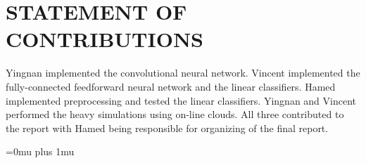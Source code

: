 \documentclass[letterpaper, 10 pt, conference]{ieeeconf}  %
\begin{document}
\addtolength{\textheight}{-12cm}   %






\section*{STATEMENT OF CONTRIBUTIONS}
Yingnan implemented the convolutional neural network.
Vincent implemented the fully-connected feedforward neural
network and the linear classifiers. Hamed implemented preprocessing and tested the linear classifiers. Yingnan and Vincent performed the heavy simulations using on-line clouds. All three contributed to the report with Hamed being responsible for organizing of the final report.






\Urlmuskip=0mu plus 1mu\relax


%
\end{document}
